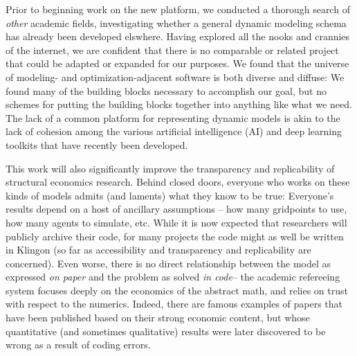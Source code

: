 \documentclass[11pt,pdftex,letterpaper]{article}
\begin{document}
Prior to beginning work on the new platform, we conducted a thorough search of \textit{other} academic fields, investigating whether a general dynamic modeling schema has already been developed elswhere. Having explored all the nooks and crannies of the internet, we are confident that there is no comparable or related project that could be adapted or expanded for our purposes. We found that the universe of modeling- and optimization-adjacent software is both diverse and diffuse: We found many of the building blocks necessary to accomplish our goal, but no schemes for putting the building blocks together into anything like what we need. The lack of a common platform for representing dynamic models is akin to the lack of cohesion among the various artificial intelligence (AI) and deep learning toolkits that have recently been developed. %


This work will also significantly improve the transparency and replicability of structural economics research. Behind closed doors, everyone who works on these kinds of models admits (and laments) what they know to be true: Everyone's results depend on a host of ancillary assumptions -- how many gridpoints to use, how many agents to simulate, etc.  While it is now expected that researchers will publicly archive their code, for many projects the code might as well be written in Klingon (so far as accessibility and transparency and replicability are concerned).  Even worse, there is no direct relationship between the model as expressed \textit{on paper} and the problem as solved \textit{in code}-- the academic refereeing system focuses deeply on the economics of the abstract math, and relies on trust with respect to the numerics. Indeed, there are famous examples of papers that have been published based on their strong economic content, but whose quantitative (and sometimes qualitative) results were later discovered to be wrong as a result of coding errors.
\end{document}
